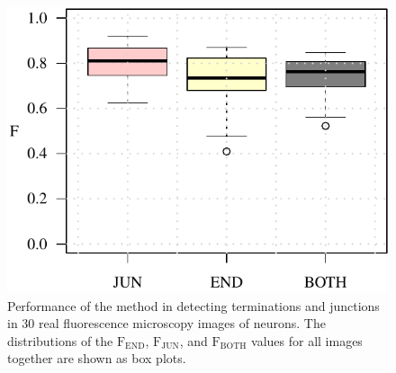\begin{figure}
	\centering
	\includegraphics[width=0.4\columnwidth]{overview_real_embedded}
	\caption{Performance of the method in detecting terminations and junctions in 30 real fluorescence microscopy images of neurons. The distributions of the $\textrm{F}_\textrm{END}$, $\textrm{F}_\textrm{JUN}$, and $\textrm{F}_\textrm{BOTH}$ values for all images together are shown as box plots.}
	\label{ch2_fig17}
\end{figure}
